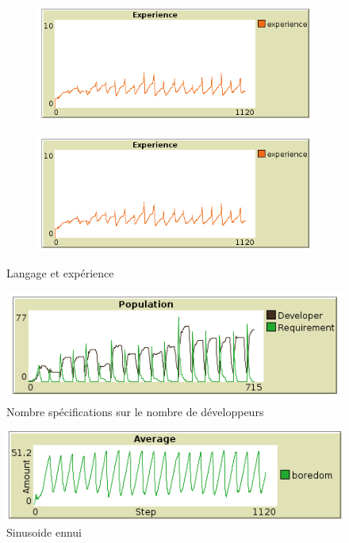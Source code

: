 \documentclass{article}
\begin{document}
\begin{figure}[H]
  \begin{subfigure}{.5\textwidth}
    \centering
    \includegraphics[width=1\linewidth]{pictures/langage40_experience.png}
  \end{subfigure}
  \begin{subfigure}{.5\textwidth}
    \centering
    \includegraphics[width=1\linewidth]{pictures/langage40_experience.png}
  \end{subfigure}
  \caption{Langage et expérience }
\end{figure}

\begin{figure}[H]
  \centerline{\includegraphics[scale=1]{pictures/popu_requirement.png}}
  \caption{Nombre spécifications sur le nombre de développeurs}
\end{figure}

\begin{figure}[H]
  \centerline{\includegraphics[scale=1]{pictures/sinusoide_ennui.png}}
  \caption{Sinusoide ennui}
\end{figure}
\end{document}

